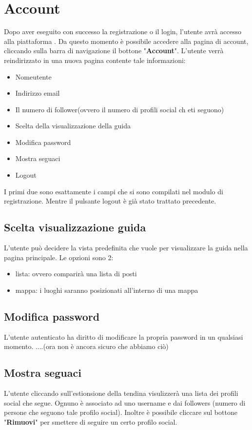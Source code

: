 \section{Account} {
    Dopo aver eseguito con successo la registrazione o il login, l'utente avrà accesso alla piattaforma \platform. Da questo momento
    è possibile accedere alla pagina di account, cliccando sulla barra di navigazione il bottone "\textbf{Account}". L'utente verrà reindirizzato
    in una nuova pagina contente tale informazioni: 
    \begin{itemize}
        \item Nomeutente
        \item Indirizzo email 
        \item Il numero di follower(ovvero il numero di profili social ch eti seguono)
        \item Scelta della visualizzazione della guida
        \item Modifica password
        \item Mostra seguaci
        \item Logout
    \end{itemize}

    I primi due sono esattamente i campi che si sono compilati nel modulo di registrazione.
    Mentre il pulsante logout è già stato trattato precedente. 

    \subsection{Scelta visualizzazione guida} {
        L'utente può decidere la vista predefinita che vuole per visualizzare la guida nella pagina principale. 
        Le opzioni sono 2: 
        \begin{itemize}
            \item lista: ovvero comparirà una lista di posti 
            \item mappa: i luoghi saranno posizionati all'interno di una mappa
        \end{itemize}
    }

    \subsection{Modifica password} {
        L'utente autenticato ha diritto di modificare la propria password in un qualsiasi momento. 
        ....(ora non è ancora sicuro che abbiamo ciò)
    }

    \subsection{Mostra seguaci} {
        L'utente cliccando sull'estionsione della tendina visulizzerà una lista dei profili social che segue. 
        Ognuno è associato ad uno username e dai followers (numero di persone che seguono tale profilo social). 
        Inoltre è possibile cliccare sul bottone "\textbf{Rimuovi}" per smettere di seguire un certo profilo social. 
    }

}

